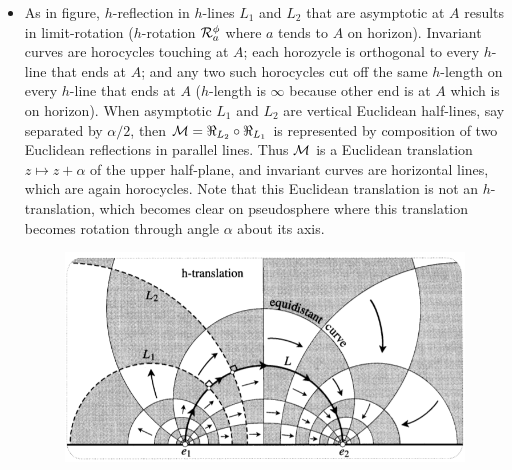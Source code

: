 \documentclass[12pt]{article}
\def\mc{\ensuremath\mathcal}
\begin{document}
\begin{itemize}
    \item As in figure, $h$-reflection in $h$-lines $L_1$ and $L_2$ that are asymptotic at $A$ results in limit-rotation ($h$-rotation $\mc{R}_{a}^{\phi}$ where $a$ tends to $A$ on horizon). Invariant curves are horocycles touching at $A$; each horozycle is orthogonal to every $h$-line that ends at $A$; and any two such horocycles cut off the same $h$-length on every $h$-line that ends at $A$ ($h$-length is $\infty$ because other end is at $A$ which is on horizon). When asymptotic $L_1$ and $L_2$ are vertical Euclidean half-lines, say separated by $\alpha/2$, then $\mc{M} = \Re_{L_2}\circ\Re_{L_1}$ is represented by composition of two Euclidean reflections in parallel lines. Thus $\mc{M}$ is a Euclidean translation $z\mapsto z+\alpha$ of the upper half-plane, and invariant curves are horizontal lines, which are again horocycles. Note that this Euclidean translation is not an $h$-translation, which becomes clear on pseudosphere where this translation becomes rotation through angle $\alpha$ about its axis.

    \begin{figure}[h!]
        \centering
        \includegraphics[scale=0.7]{fig_24}
        \label{fig_24}
    \end{figure}


\end{itemize}
\end{document}
